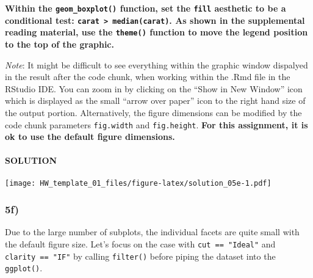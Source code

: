 \documentclass[]{article}
\newenvironment{Shaded}{\begin{snugshade}}{\end{snugshade}}
\newcommand{\DataTypeTok}[1]{\textcolor[rgb]{0.13,0.29,0.53}{#1}}
\newcommand{\KeywordTok}[1]{\textcolor[rgb]{0.13,0.29,0.53}{\textbf{#1}}}
\newcommand{\NormalTok}[1]{#1}
\newcommand{\OperatorTok}[1]{\textcolor[rgb]{0.81,0.36,0.00}{\textbf{#1}}}
\newcommand{\StringTok}[1]{\textcolor[rgb]{0.31,0.60,0.02}{#1}}
\let\oldparagraph\paragraph
\renewcommand{\paragraph}[1]{\oldparagraph{#1}\mbox{}}
\begin{document}
\textbf{Within the \texttt{geom\_boxplot()} function, set the
\texttt{fill} aesthetic to be a conditional test:
\texttt{carat\ \textgreater{}\ median(carat)}. As shown in the
supplemental reading material, use the \texttt{theme()} function to move
the legend position to the top of the graphic.}

\emph{Note}: It might be difficult to see everything within the graphic
window dispalyed in the result after the code chunk, when working within
the .Rmd file in the RStudio IDE. You can zoom in by clicking on the
``Show in New Window'' icon which is displayed as the small ``arrow over
paper'' icon to the right hand size of the output portion.
Alternatively, the figure dimensions can be modified by the code chunk
parameters \texttt{fig.width} and \texttt{fig.height}. \textbf{For this
assignment, it is ok to use the default figure dimensions.}

\hypertarget{solution-27}{%
\paragraph{SOLUTION}\label{solution-27}}

\begin{Shaded}
\end{Shaded}

\texttt{[image: HW\_template\_01\_files/figure-latex/solution\_05e-1.pdf]}

\hypertarget{f-2}{%
\subsubsection{5f)}\label{f-2}}

Due to the large number of subplots, the individual facets are quite
small with the default figure size. Let's focus on the case with
\texttt{cut\ ==\ "Ideal"} and \texttt{clarity\ ==\ "IF"} by calling
\texttt{filter()} before piping the dataset into the \texttt{ggplot()}.
\end{document}
